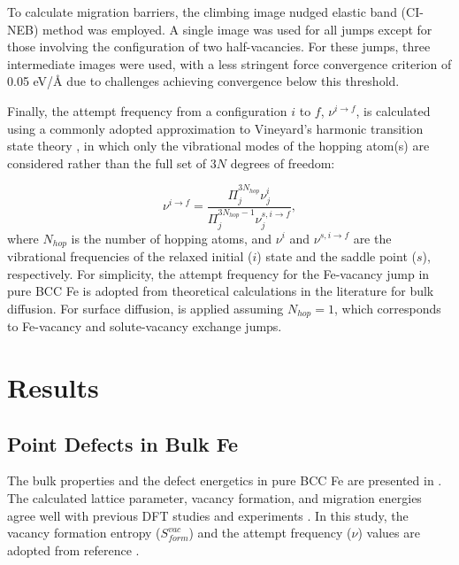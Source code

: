 \documentclass[preprint,12pt]{elsarticle}
\begin{document}
To calculate migration barriers, the climbing image nudged elastic band (CI-NEB) method \cite{henkelman_climbing_2000} was employed. A single image was used for all jumps except for those involving the configuration of two half-vacancies. For these jumps, three intermediate images were used, with a less stringent force convergence criterion of 0.05 eV/{\AA} due to challenges achieving convergence below this threshold.


Finally, the attempt frequency from a configuration $i$ to $f$, $\nu^{i\rightarrow f}$, is calculated using a commonly adopted approximation to Vineyard's harmonic transition state theory \cite{vineyard_frequency_1957}, in which only the vibrational modes of the hopping atom(s) are considered rather than the full set of $3N$ degrees of freedom:

\begin{equation}
    \label{eq:attempt_freq}
    \nu^{i\rightarrow f} = \frac{\Pi^{3N_{hop}}_j  \nu^{i}_j}{\Pi^{3N_{hop}-1}_j  \nu^{s,i\rightarrow f}_j},
\end{equation}
where $N_{hop}$ is the number of hopping atoms, and $\nu^{i}$ and $\nu^{s,i\rightarrow f}$ are the vibrational frequencies of the relaxed initial ($i$) state and the saddle point ($s$), respectively. For simplicity, the attempt frequency for the Fe-vacancy jump in pure BCC Fe is adopted from theoretical calculations in the literature \cite{messina_systematic_2016} for bulk diffusion. For surface diffusion,  is applied
assuming $N_{hop}=1$, which corresponds to Fe-vacancy and solute-vacancy exchange jumps.


\FloatBarrier
\section{Results}

\subsection{Point Defects in Bulk Fe}

\noindent The bulk properties and the defect energetics in pure BCC Fe are presented in . The calculated lattice parameter, vacancy formation, and migration energies agree well with previous DFT studies \cite{messina_exact_2014, murali_bcc_fe_2015, yang_significant_2023, Li_magnetic_2021, choudhury2011ab} and experiments \cite{kittel2018introduction, schepper_positron1983, tapasa2007computer}. In this study, the vacancy formation entropy ($S_{form}^{vac}$) and the attempt frequency ($\nu$) values are adopted from reference \cite{messina_systematic_2016}. 
\end{document}
